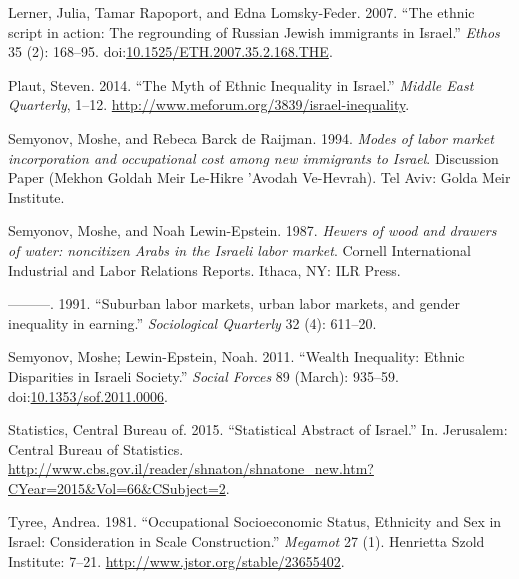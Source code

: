 \documentclass[12pt,twoside]{reedthesis}
\begin{document}
  \hypertarget{ref-Lerner2007}{}
  Lerner, Julia, Tamar Rapoport, and Edna Lomsky-Feder. 2007. ``The ethnic
  script in action: The regrounding of Russian Jewish immigrants in
  Israel.'' \emph{Ethos} 35 (2): 168--95.
  doi:\href{https://doi.org/10.1525/ETH.2007.35.2.168.THE}{10.1525/ETH.2007.35.2.168.THE}.
  
  \hypertarget{ref-Plaut2014a}{}
  Plaut, Steven. 2014. ``The Myth of Ethnic Inequality in Israel.''
  \emph{Middle East Quarterly}, 1--12.
  \url{http://www.meforum.org/3839/israel-inequality}.
  
  \hypertarget{ref-Semyonov1994a}{}
  Semyonov, Moshe, and Rebeca Barck de Raijman. 1994. \emph{Modes of labor
  market incorporation and occupational cost among new immigrants to
  Israel}. Discussion Paper (Mekhon Goldah Meir Le-Hikre 'Avodah
  Ve-Hevrah). Tel Aviv: Golda Meir Institute.
  
  \hypertarget{ref-Semyonov1987}{}
  Semyonov, Moshe, and Noah Lewin-Epstein. 1987. \emph{Hewers of wood and
  drawers of water: noncitizen Arabs in the Israeli labor market}. Cornell
  International Industrial and Labor Relations Reports. Ithaca, NY: ILR
  Press.
  
  \hypertarget{ref-Semyonov1991}{}
  ---------. 1991. ``Suburban labor markets, urban labor markets, and
  gender inequality in earning.'' \emph{Sociological Quarterly} 32 (4):
  611--20.
  
  \hypertarget{ref-Semyonov2011b}{}
  Semyonov, Moshe; Lewin-Epstein, Noah. 2011. ``Wealth Inequality: Ethnic
  Disparities in Israeli Society.'' \emph{Social Forces} 89 (March):
  935--59.
  doi:\href{https://doi.org/10.1353/sof.2011.0006}{10.1353/sof.2011.0006}.
  
  \hypertarget{ref-stat2015}{}
  Statistics, Central Bureau of. 2015. ``Statistical Abstract of Israel.''
  In. Jerusalem: Central Bureau of Statistics.
  \url{http://www.cbs.gov.il/reader/shnaton/shnatone_new.htm?CYear=2015\&Vol=66\&CSubject=2}.
  
  \hypertarget{ref-Tyree1981}{}
  Tyree, Andrea. 1981. ``Occupational Socioeconomic Status, Ethnicity and
  Sex in Israel: Consideration in Scale Construction.'' \emph{Megamot} 27
  (1). Henrietta Szold Institute: 7--21.
  \url{http://www.jstor.org/stable/23655402}.


\end{document}
